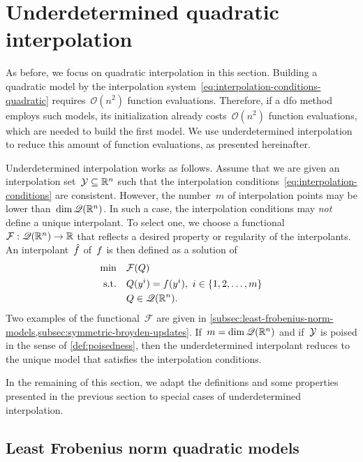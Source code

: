\section{Underdetermined quadratic interpolation}
\label{sec:underdetermined-interpolation}

As before, we focus on quadratic interpolation in this section.
Building a quadratic model by the interpolation system~\cref{eq:interpolation-conditions-quadratic} requires~$\mathcal{O}(n^2)$ function evaluations.
Therefore, if a \gls{dfo} method employs such models, its initialization already costs~$\mathcal{O}(n^2)$ function evaluations, which are needed to build the first model.
We use underdetermined interpolation to reduce this amount of function evaluations, as presented hereinafter.

Underdetermined interpolation works as follows.
Assume that we are given an interpolation set~$\xpt \subseteq \R^n$ such that the interpolation conditions~\cref{eq:interpolation-conditions} are consistent.
However, the number~$m$ of interpolation points may be lower than~$\dim \mathscr{Q}(\mathbb{R}^n)$.
In such a case, the interpolation conditions may \emph{not} define a unique interpolant.
To select one, we choose a functional~$\mathcal{F} : \mathscr{Q}(\mathbb{R}^n) \to \mathbb{R}$ that reflects a desired property or regularity of the interpolants.
An interpolant~$\objm$ of~$f$ is then defined as a solution of
\begin{subequations}
    \label{eq:underdetermined-models}
    \begin{align}
        \min        & \quad \mathcal{F}(Q)\\
        \text{s.t.} & \quad Q(y^i) = f(y^i), ~ i \in \{1, 2, \dots, m\}\\
                    & \quad Q \in \mathscr{Q}(\mathbb{R}^n). \nonumber
    \end{align}
\end{subequations}
Two examples of the functional~$\mathcal{F}$ are given in \cref{subsec:least-frobenius-norm-models,subsec:symmetric-broyden-updates}.
If~$m = \dim \mathscr{Q}(\mathbb{R}^n)$ and if~$\xpt$ is poised in the sense of \cref{def:poisedness}, then the underdetermined interpolant reduces to the unique model that satisfies the interpolation conditions.

In the remaining of this section, we adapt the definitions and some properties presented in the previous section to special cases of underdetermined interpolation.

\subsection{Least Frobenius norm quadratic models}
\label{subsec:least-frobenius-norm-models}

